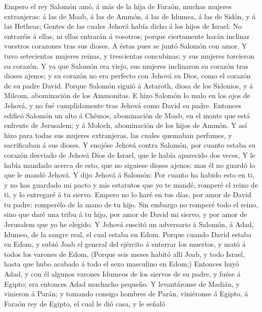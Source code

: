  Empero el rey Salomón amó, á más de la hija de Faraón,
muchas mujeres extranjeras: á las de Moab, á las de Ammón, á las de
Idumea, á las de Sidón, y á las Hetheas;  Gentes de las
cuales Jehová había dicho á los hijos de Israel: No entraréis á ellas,
ni ellas entrarán á vosotros; porque ciertamente harán inclinar vuestros
corazones tras sus dioses. A éstas pues se juntó Salomón con amor.
 Y tuvo setecientas mujeres reinas, y trescientas
concubinas; y sus mujeres torcieron su corazón.  Y ya que
Salomón era viejo, sus mujeres inclinaron su corazón tras dioses ajenos;
y su corazón no era perfecto con Jehová su Dios, como el corazón de su
padre David.  Porque Salomón siguió á Astaroth, diosa de los
Sidonios, y á Milcom, abominación de los Ammonitas.  E hizo
Salomón lo malo en los ojos de Jehová, y no fué cumplidamente tras
Jehová como David su padre.  Entonces edificó Salomón un
alto á Chêmos, abominación de Moab, en el monte que está enfrente de
Jerusalem; y á Moloch, abominación de los hijos de Ammón.  Y
así hizo para todas sus mujeres extranjeras, las cuales quemaban
perfumes, y sacrificaban á sus dioses.  Y enojóse Jehová
contra Salomón, por cuanto estaba su corazón desviado de Jehová Dios de
Israel, que le había aparecido dos veces,  Y le había
mandado acerca de esto, que no siguiese dioses ajenos: mas él no guardó
lo que le mandó Jehová.  Y dijo Jehová á Salomón: Por
cuanto ha habido esto en ti, y no has guardado mi pacto y mis estatutos
que yo te mandé, romperé el reino de ti, y lo entregaré á tu siervo.
 Empero no lo haré en tus días, por amor de David tu padre:
romperélo de la mano de tu hijo.  Sin embargo no romperé
todo el reino, sino que daré una tribu á tu hijo, por amor de David mi
siervo, y por amor de Jerusalem que yo he elegido.  Y
Jehová suscitó un adversario á Salomón, á Adad, Idumeo, de la sangre
real, el cual estaba en Edom.  Porque cuando David estaba
en Edom, y subió Joab el general del ejército á enterrar los muertos, y
mató á todos los varones de Edom,  (Porque seis meses
habitó allí Joab, y todo Israel, hasta que hubo acabado á todo el sexo
masculino en Edom;)  Entonces huyó Adad, y con él algunos
varones Idumeos de los siervos de su padre, y fuése á Egipto; era
entonces Adad muchacho pequeño.  Y levantáronse de Madián,
y vinieron á Parán; y tomando consigo hombres de Parán, viniéronse á
Egipto, á Faraón rey de Egipto, el cual le dió casa, y le señaló
